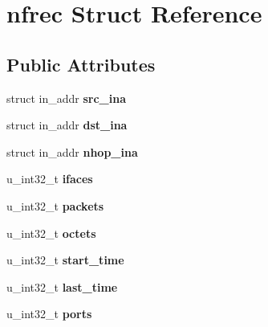 \hypertarget{structnfrec}{
\section{nfrec Struct Reference}
\label{structnfrec}
}
\subsection*{Public Attributes}
\begin{DoxyCompactItemize}
\item 
\hypertarget{structnfrec_af438c1f058eed07d26f45c41c3b34e9d}{
struct in\_\-addr {\bfseries src\_\-ina}}
\label{structnfrec_af438c1f058eed07d26f45c41c3b34e9d}

\item 
\hypertarget{structnfrec_ae40a11a682f853936c0328c10a0dc1f5}{
struct in\_\-addr {\bfseries dst\_\-ina}}
\label{structnfrec_ae40a11a682f853936c0328c10a0dc1f5}

\item 
\hypertarget{structnfrec_a1c627af7153024011c1585797891108b}{
struct in\_\-addr {\bfseries nhop\_\-ina}}
\label{structnfrec_a1c627af7153024011c1585797891108b}

\item 
\hypertarget{structnfrec_ada4e41e0eb2b2df8a6c9d8e1c9d64fff}{
u\_\-int32\_\-t {\bfseries ifaces}}
\label{structnfrec_ada4e41e0eb2b2df8a6c9d8e1c9d64fff}

\item 
\hypertarget{structnfrec_a548257ce66f8d560f1f66c10387fff2a}{
u\_\-int32\_\-t {\bfseries packets}}
\label{structnfrec_a548257ce66f8d560f1f66c10387fff2a}

\item 
\hypertarget{structnfrec_a820c4c1965073ec9be9ef880acc4f607}{
u\_\-int32\_\-t {\bfseries octets}}
\label{structnfrec_a820c4c1965073ec9be9ef880acc4f607}

\item 
\hypertarget{structnfrec_ad57662d76fcdbfc89c340728ec7f9ad4}{
u\_\-int32\_\-t {\bfseries start\_\-time}}
\label{structnfrec_ad57662d76fcdbfc89c340728ec7f9ad4}

\item 
\hypertarget{structnfrec_aef728fa6ecd2f68d81f9f9cfa825ec3e}{
u\_\-int32\_\-t {\bfseries last\_\-time}}
\label{structnfrec_aef728fa6ecd2f68d81f9f9cfa825ec3e}

\item 
\hypertarget{structnfrec_a6806735843f5b746153f1d695b40f561}{
u\_\-int32\_\-t {\bfseries ports}}
\label{structnfrec_a6806735843f5b746153f1d695b40f561}


\end{DoxyCompactItemize}
